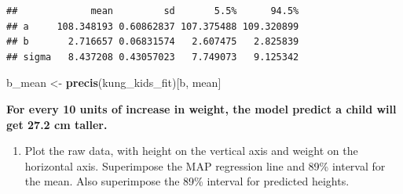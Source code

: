 \documentclass[
]{book}
\newenvironment{Shaded}{\begin{snugshade}}{\end{snugshade}}
\newcommand{\KeywordTok}[1]{\textcolor[rgb]{0.13,0.29,0.53}{\textbf{#1}}}
\newcommand{\NormalTok}[1]{#1}
\newcommand{\StringTok}[1]{\textcolor[rgb]{0.31,0.60,0.02}{#1}}
\providecommand{\tightlist}{%
  \setlength{\itemsep}{0pt}\setlength{\parskip}{0pt}}
\begin{document}
\begin{verbatim}
##             mean         sd       5.5%      94.5%
## a     108.348193 0.60862837 107.375488 109.320899
## b       2.716657 0.06831574   2.607475   2.825839
## sigma   8.437208 0.43057023   7.749073   9.125342
\end{verbatim}

\begin{Shaded}
\begin{Highlighting}[]
\NormalTok{b\_mean \textless{}{-}}\StringTok{ }\KeywordTok{precis}\NormalTok{(kung\_kids\_fit)[}\StringTok{\textquotesingle{}b\textquotesingle{}}\NormalTok{, }\StringTok{\textquotesingle{}mean\textquotesingle{}}\NormalTok{]}
\end{Highlighting}
\end{Shaded}

\textbf{For every 10 units of increase in weight, the model predict a child will get 27.2 cm taller.}

\begin{enumerate}
\def\labelenumi{\alph{enumi}.}
\setcounter{enumi}{1}
\tightlist
\item
  Plot the raw data, with height on the vertical axis and weight on the horizontal axis. Superimpose the MAP regression line and 89\% interval for the mean. Also superimpose the 89\% interval for predicted heights.
\end{enumerate}
\end{document}
